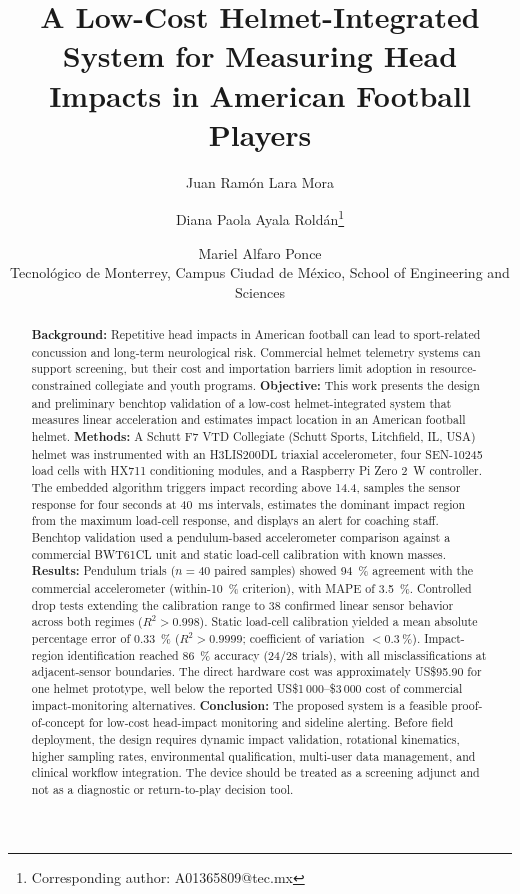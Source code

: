 \documentclass[11pt]{article}
\title{A Low-Cost Helmet-Integrated System for Measuring Head Impacts in American Football Players}
\author{Juan Ram\'on Lara Mora \and Diana Paola Ayala Rold\'an\thanks{Corresponding author: A01365809@tec.mx} \and Mariel Alfaro Ponce\\[0.5em]
\small Tecnol\'ogico de Monterrey, Campus Ciudad de M\'exico, School of Engineering and Sciences}
\date{}
\begin{document}
\maketitle

\begin{abstract}
\noindent\textbf{Background:} Repetitive head impacts in American football can lead to sport-related concussion and long-term neurological risk. Commercial helmet telemetry systems can support screening, but their cost and importation barriers limit adoption in resource-constrained collegiate and youth programs. \textbf{Objective:} This work presents the design and preliminary benchtop validation of a low-cost helmet-integrated system that measures linear acceleration and estimates impact location in an American football helmet. \textbf{Methods:} A Schutt F7 VTD Collegiate (Schutt Sports, Litchfield, IL, USA) helmet was instrumented with an H3LIS200DL triaxial accelerometer, four SEN-10245 load cells with HX711 conditioning modules, and a Raspberry Pi Zero 2~W controller. The embedded algorithm triggers impact recording above \SI{14.4}{\gee}, samples the sensor response for four seconds at \SI{40}{ms} intervals, estimates the dominant impact region from the maximum load-cell response, and displays an alert for coaching staff. Benchtop validation used a pendulum-based accelerometer comparison against a commercial BWT61CL unit and static load-cell calibration with known masses. \textbf{Results:} Pendulum trials ($n = 40$ paired samples) showed \SI{94}{\percent} agreement with the commercial accelerometer (within-\SI{10}{\percent} criterion), with MAPE of \SI{3.5}{\percent}. Controlled drop tests extending the calibration range to \SI{38}{\gee} confirmed linear sensor behavior across both regimes ($R^2 > 0.998$). Static load-cell calibration yielded a mean absolute percentage error of \SI{0.33}{\percent} ($R^2 > 0.9999$; coefficient of variation $< \SI{0.3}{\percent}$). Impact-region identification reached \SI{86}{\percent} accuracy (24/28 trials), with all misclassifications at adjacent-sensor boundaries. The direct hardware cost was approximately US\$95.90 for one helmet prototype, well below the reported US\$1\,000--\$3\,000 cost of commercial impact-monitoring alternatives. \textbf{Conclusion:} The proposed system is a feasible proof-of-concept for low-cost head-impact monitoring and sideline alerting. Before field deployment, the design requires dynamic impact validation, rotational kinematics, higher sampling rates, environmental qualification, multi-user data management, and clinical workflow integration. The device should be treated as a screening adjunct and not as a diagnostic or return-to-play decision tool.
\end{abstract}
\end{document}
